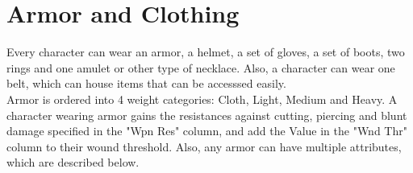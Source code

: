 \section{Armor and Clothing}
Every character can wear an armor, a helmet, a set of gloves, a set of boots, two rings and one amulet or other type of necklace. Also, a character can wear one belt, which can house items that can be accesssed easily.\\
Armor is ordered into 4 weight categories: Cloth, Light, Medium and Heavy. A character wearing armor gains the resistances against cutting, piercing and blunt damage specified in the "Wpn Res" column, and add the Value in the "Wnd Thr" column to their wound threshold. Also, any armor can have multiple attributes, which are described below.\\









